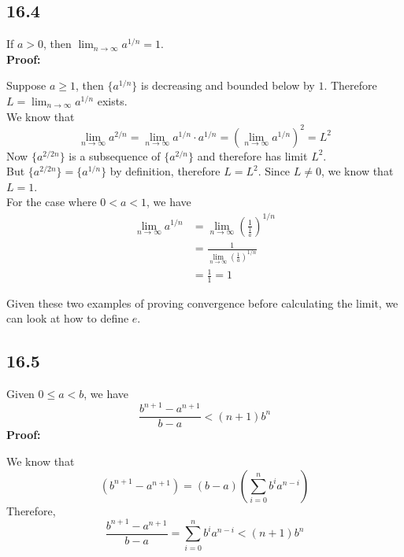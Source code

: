 \documentclass{article}
\begin{document}
\subsection*{16.4}
If $a > 0$, then $\lim_{n \rightarrow \infty} a^{1/n} = 1$.\\
\textbf{Proof:}
\begin{addmargin}[1em]{0em}
    Suppose $a \geq 1$, then $\{a^{1/n}\}$ is decreasing and bounded below by $1$. Therefore $L = \lim_{n \rightarrow \infty} a^{1/n}$ exists.\\
    We know that
    \begin{equation*}
        \lim_{n \rightarrow \infty} a^{2/n} = \lim_{n \rightarrow \infty} a^{1/n} \cdot a^{1/n} = (\lim_{n \rightarrow \infty} a^{1/n})^2 = L^2
    \end{equation*}
    Now $\{a^{2/2n}\}$ is a subsequence of $\{a^{2/n}\}$ and therefore has limit $L^2$.\\
    But $\{a^{2/2n}\} = \{a^{1/n}\}$ by definition, therefore $L = L^2$. Since $L \neq 0$, we know that $L = 1$.\\
    For the case where $0 < a < 1$, we have
    \begin{equation*}
        \begin{split}
            \lim_{n \rightarrow \infty} a^{1/n} &= \lim_{n \rightarrow \infty} \left(\frac{1}{\frac{1}{a}}\right)^{1/n}\\
            &= \frac{1}{\lim_{n \rightarrow \infty}(\frac{1}{a})^{1/n}}\\
            &= \frac{1}{1} = 1
        \end{split}
    \end{equation*}
\end{addmargin}
Given these two examples of proving convergence before calculating the limit, we can look at how to define $e$.
\subsection*{16.5}
Given $0 \leq a < b$, we have
\begin{equation*}
    \frac{b^{n+1} - a^{n+1}}{b-a} < (n+1)b^n
\end{equation*}
\textbf{Proof:}
\begin{addmargin}[1em]{0em}
    We know that
    \begin{equation*}
        (b^{n+1} - a^{n+1}) = (b - a)\left(
            \sum_{i=0}^{n} b^ia^{n-i}
        \right)
    \end{equation*} 
    Therefore,
    \begin{equation*}
        \frac{b^{n+1} - a^{n+1}}{b-a} = \sum_{i=0}^{n} b^ia^{n-i} < (n+1) b^n
    \end{equation*}
\end{addmargin}
\end{document}
